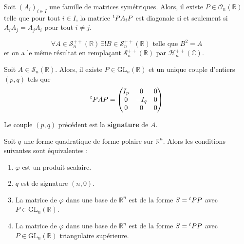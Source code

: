   \begin{application}
    Soit $(A_i)_{i \in I}$ une famille de matrices symétriques. Alors, il existe $P \in \mathcal{O}_n(\mathbb{R})$ telle que pour tout $i \in I$, la matrice $\mathstrut ^t P A_i P$ est diagonale si et seulement si $A_i A_j = A_j A_i$ pour tout $i \neq j$.
  \end{application}
  
  
  \begin{application}
    \[ \forall A \in \mathcal{S}_n^{++}(\mathbb{R}) \, \exists! B \in \mathcal{S}_n^{++}(\mathbb{R}) \text{ telle que } B^2 = A \]
    et on a le même résultat en remplaçant $\mathcal{S}_n^{++}(\mathbb{R})$ par $\mathcal{H}_n^{++}(\mathbb{C})$.
  \end{application}
  
  
  \begin{theorem}
    Soit $A \in \mathcal{S}_n(\mathbb{R})$. Alors, il existe $P \in \mathrm{GL}_n(\mathbb{R})$ et un unique couple d'entiers $(p,q)$ tels que
    \[ \mathstrut ^t PAP = \begin{pmatrix} I_p & 0 & 0 \\ 0 & -I_q & 0 \\ 0 & 0 & 0 \end{pmatrix} \]
  \end{theorem}
  
  \begin{definition}
    Le couple $(p,q)$ précédent est la \textbf{signature} de $A$.
  \end{definition}
  
  \begin{proposition}
    Soit $q$ une forme quadratique de forme polaire sur $\mathbb{R}^n$. Alors les conditions suivantes sont équivalentes :
    \begin{enumerate}[label=(\roman*)]
      \item $\varphi$ est un produit scalaire.
      \item $q$ est de signature $(n,0)$.
      \item La matrice de $\varphi$ dans une base de $\mathbb{R}^n$ est de la forme $S = \mathstrut ^t PP$ avec $P \in \mathrm{GL}_n(\mathbb{R})$.
      \item La matrice de $\varphi$ dans une base de $\mathbb{R}^n$ est de la forme $S = \mathstrut ^t PP$ avec $P \in \mathrm{GL}_n(\mathbb{R})$ triangulaire supérieure.
    \end{enumerate}
  \end{proposition}
  
